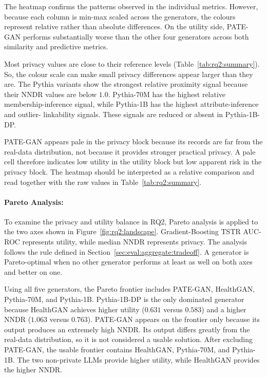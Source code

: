 The heatmap confirms the patterns observed in the individual metrics.
However, because each column is min-max scaled across the generators, the
colours represent relative rather than absolute differences. On the utility
side, PATE-GAN performs substantially worse than the other four generators
across both similarity and predictive metrics.

Most privacy values are close to their reference levels
(Table~\ref{tab:rq2:summary}). So, the colour scale can make small
privacy differences appear larger than they are. The Pythia variants show
the strongest relative proximity signal because their NNDR values are
below $1.0$. Pythia-70M has the highest relative membership-inference
signal, while Pythia-1B has the highest attribute-inference and outlier-
linkability signals. These signals are reduced or absent in Pythia-1B-DP.

PATE-GAN appears pale in the privacy block because its records are far from
the real-data distribution, not because it provides stronger practical
privacy. A pale cell therefore indicates low utility in the utility block
but low apparent risk in the privacy block. The heatmap should
be interpreted as a relative comparison and read together with the raw
values in Table~\ref{tab:rq2:summary}.

\paragraph{Pareto Analysis:}
\label{sec:results:rq2:pareto}

To examine the privacy and utility balance in RQ2, Pareto analysis is
applied to the two axes shown in Figure~\ref{fig:rq2:landscape}.
Gradient-Boosting TSTR AUC-ROC represents utility, while median NNDR
represents privacy. The analysis follows the rule defined in
Section~\ref{sec:eval:aggregate:tradeoff}. A generator is Pareto-optimal
when no other generator performs at least as well on both axes and better
on one.

Using all five generators, the Pareto frontier includes PATE-GAN,
HealthGAN, Pythia-70M, and Pythia-1B. Pythia-1B-DP is the only dominated
generator because HealthGAN achieves higher utility ($0.631$ versus
$0.583$) and a higher NNDR ($1.063$ versus $0.763$). PATE-GAN appears on
the frontier only because its output produces an extremely high NNDR. Its
output differs greatly from the real-data distribution, so it is not
considered a usable solution. After excluding PATE-GAN, the usable
frontier contains HealthGAN, Pythia-70M, and Pythia-1B. The two
non-private LLMs provide higher utility, while HealthGAN provides the
higher NNDR.

